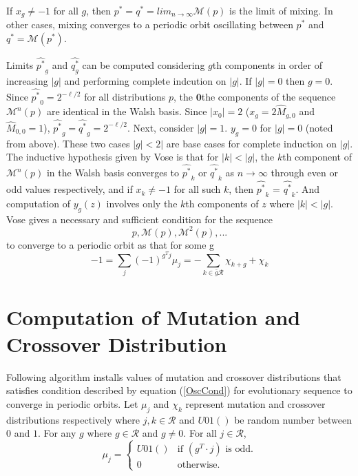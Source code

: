 If $x_g \neq −1$ for all $g$, then $p^\ast = q^\ast = lim_{n \rightarrow \infty} \mathcal{M}(p)$ is the limit of mixing. In other cases, 
mixing converges to a periodic orbit oscillating between $p^\ast$ and $q^\ast = \mathcal{M}(p^\ast)$.

Limits $\widehat{p^{\ast}}_g$ and $\widehat{q^{\ast}_g}$ can be computed considering $g$th components in order of increasing $|g|$ and 
performing complete indcution on $|g|$. If $|g| = 0$ then $g = 0$. Since $\widehat{p^\ast}_0 = 2^{-\ell/2}$ for all distributions $p$, 
the $\textbf{0}$the components of the sequence $\mathcal{M}^n(p)$ are identical in the Walsh basis. Since $|x_0| = 2$ ($x_g = 2\widehat{M}_{g,0}$ 
and $\widehat{M}_{0,0} = 1$), $\widehat{p^{\ast}}_g = \widehat{q^{\ast}}_g = 2^{-\ell/2}$. Next, consider $|g| = 1$. $y_g = 0$ for $|g| = 0$ 
(noted from above). These two cases $|g| < 2|$ are base cases for complete induction on $|g|$. The inductive hypothesis given by Vose is that 
for $|k| < |g|$, the $k$th component of $\mathcal{M}^n(p)$ in the Walsh basis converges to $\widehat{p^{\ast}}_k$ or $\widehat{q^{\ast}}_k$ as 
$n \rightarrow \infty$ through even or odd values respectively, and if $x_k \neq -1$ for all such $k$, then 
$\widehat{p^{\ast}}_k$ = $\widehat{q^{\ast}}_k$. And computation of $y_g(z)$ involves only the $k$th components of $z$ where $|k| < |g|$. 
\newline 
Vose gives a necessary and sufficient condition for the sequence
\[
p, \mathcal{M}(p), \mathcal{M}^2(p),...
\]
to converge to a periodic orbit as that for some g
\begin{equation}
\label{OscCond}
-1 = \sum \limits_{j} (-1)^{g^T j} \mu_j = - \sum \limits_{k \in \bar{g}\mathcal{R}} \chi_{k+g} + \chi_k
\end{equation}
 
\section{Computation of Mutation and Crossover Distribution}
Following algorithm installs values of mutation and crossover distributions that satisfies condition described by equation (\ref{OscCond}) for evolutionary sequence to converge in periodic orbits.
Let $\mu_j$ and $\chi_k$ represent mutation and crossover distributions respectively where $j,k \in \mathcal{R}$ and $U01()$ be random number between $0$ and $1$. For any $g$ where $g \in \mathcal{R}$ and $g \neq 0$.
For all $j \in \mathcal{R}$,
\[
\mu_j = \begin{cases}
    U01() & \text{if $(g^T\cdot j)$ is odd}.\\
    0 & \text{otherwise}.
  \end{cases}
\]

